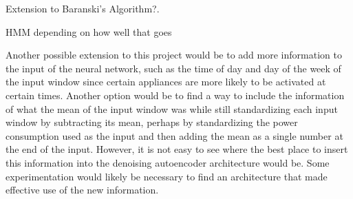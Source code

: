 \documentclass{article}
\begin{document}
Extension to Baranski's Algorithm?.

HMM depending on how well that goes

Another possible extension to this project would be to add more information to the input of the neural network, such as the time of day and day of the week of the input window since certain appliances are more likely to be activated at certain times. Another option would be to find a way to include the information of what the mean of the input window was while still standardizing each input window by subtracting its mean\cite{Kelly}, perhaps by standardizing the power consumption used as the input and then adding the mean as a single number at the end of the input. However, it is not easy to see where the best place to insert this information into the denoising autoencoder architecture would be. Some experimentation would likely be necessary to find an architecture that made effective use of the new information.




\end{document}
